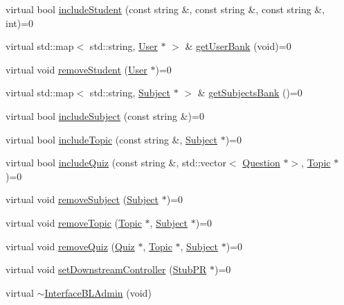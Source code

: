 \begin{DoxyCompactItemize}
\item 
virtual bool \hyperlink{class_interface_b_l_admin_a716e03cae2e978d281f813ea98137191}{include\+Student} (const string \&, const string \&, const string \&, int)=0
\item 
virtual std\+::map$<$ std\+::string, \hyperlink{class_user}{User} $\ast$ $>$ \& \hyperlink{class_interface_b_l_admin_a785c49557dc1dd6a955ee12db1bb6925}{get\+User\+Bank} (void)=0
\item 
virtual void \hyperlink{class_interface_b_l_admin_ac1e32eeb8d7a76c933024fc639fff67f}{remove\+Student} (\hyperlink{class_user}{User} $\ast$)=0
\item 
virtual std\+::map$<$ std\+::string, \hyperlink{class_subject}{Subject} $\ast$ $>$ \& \hyperlink{class_interface_b_l_admin_ace992c81c3ca58363336ff2f7fbbda0b}{get\+Subjects\+Bank} ()=0
\item 
virtual bool \hyperlink{class_interface_b_l_admin_aa0b718aa7b0f47adad6601c7470fb8c4}{include\+Subject} (const string \&)=0
\item 
virtual bool \hyperlink{class_interface_b_l_admin_aa1d0fe6d4886260d1aa47d7bf73ad9ff}{include\+Topic} (const string \&, \hyperlink{class_subject}{Subject} $\ast$)=0
\item 
virtual bool \hyperlink{class_interface_b_l_admin_aca0cf080ee23134183cf70dd094edfe2}{include\+Quiz} (const string \&, std\+::vector$<$ \hyperlink{class_question}{Question} $\ast$$>$, \hyperlink{class_topic}{Topic} $\ast$)=0
\item 
virtual void \hyperlink{class_interface_b_l_admin_aed60dd105ebed648c834d57c6b1c9224}{remove\+Subject} (\hyperlink{class_subject}{Subject} $\ast$)=0
\item 
virtual void \hyperlink{class_interface_b_l_admin_a9ec942ebf3eb4a742de514801a378aca}{remove\+Topic} (\hyperlink{class_topic}{Topic} $\ast$, \hyperlink{class_subject}{Subject} $\ast$)=0
\item 
virtual void \hyperlink{class_interface_b_l_admin_a5e0da435e49e43b169b13725df5a354a}{remove\+Quiz} (\hyperlink{class_quiz}{Quiz} $\ast$, \hyperlink{class_topic}{Topic} $\ast$, \hyperlink{class_subject}{Subject} $\ast$)=0
\item 
virtual void \hyperlink{class_interface_b_l_admin_abe950882707e9b393dd989af66ab2f9f}{set\+Downstream\+Controller} (\hyperlink{class_stub_p_r}{Stub\+PR} $\ast$)=0
\item 
virtual \hyperlink{class_interface_b_l_admin_a4e4c51ea35af8630cb8e5a52f9c021a0}{$\sim$\+Interface\+B\+L\+Admin} (void)
\end{DoxyCompactItemize}


